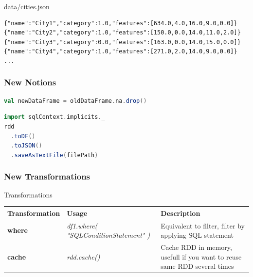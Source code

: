 \documentclass[slidetop,9pt,utf8]{beamer}
\begin{document}
\begin{CJK}{UTF8}{gbsn}
\begin{frame}[fragile]
  \begin{block}{data/cities.json}
    \begin{verbatim}
{"name":"City1","category":1.0,"features":[634.0,4.0,16.0,9.0,0.0]}
{"name":"City2","category":1.0,"features":[150.0,0.0,14.0,11.0,2.0]}
{"name":"City3","category":0.0,"features":[163.0,0.0,14.0,15.0,0.0]}
{"name":"City4","category":1.0,"features":[271.0,2.0,14.0,9.0,0.0]}
...
    \end{verbatim}
  \end{block}

\end{frame}

\begin{frame}[fragile]
  \frametitle{New Notions}

  \begin{lstlisting}[label=DropNullValue, caption=Drop rows containing null values, language=scala, style=code]
val newDataFrame = oldDataFrame.na.drop()
  \end{lstlisting}

  \begin{lstlisting}[label=SaveJsonFile, caption=Save RDD to JSON File, language=scala, style=code]
import sqlContext.implicits._
rdd
  .toDF()
  .toJSON()
  .saveAsTextFile(filePath)
  \end{lstlisting}

\end{frame}

\begin{frame}

  \frametitle{New Transformations}

  \begin{block}{Transformations}
    \begin{center}
      \begin{tabular}{|m{2.1cm}|m{3.5cm}|m{5cm}|}
        \hline 
        \rowcolor{gray} \textbf{Transformation} & \textbf{Usage} & \textbf{Description} \\ \hline
        \textbf{where} & \textit{df1.where( \newline  "SQLConditionStatement" \newline )} & Equivalent to filter, filter by applying SQL statement \\ \hline
        \textbf{cache} & \textit{rdd.cache()} & Cache RDD in memory, usefull if you want to reuse same RDD several times \\ \hline
      \end{tabular}
    \end{center}
  \end{block}


\end{frame}
\end{CJK}
\end{document}
